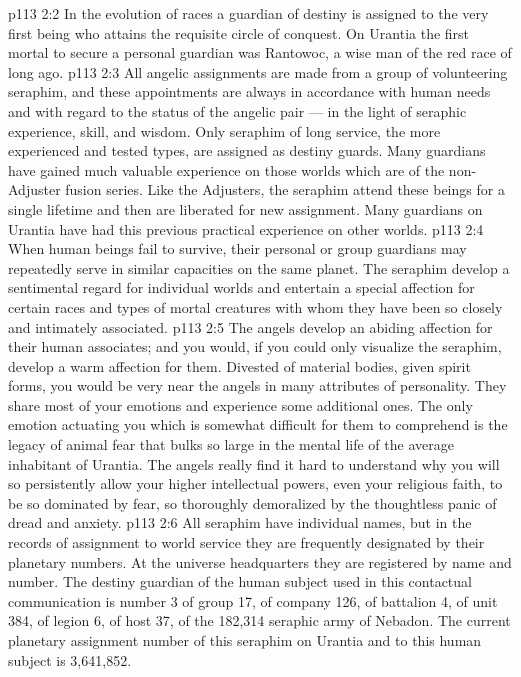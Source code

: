 \vs p113 2:2 In the evolution of races a guardian of destiny is assigned to the very first being who attains the requisite circle of conquest. On Urantia the first mortal to secure a personal guardian was Rantowoc, a wise man of the red race of long ago.
\vs p113 2:3 All angelic assignments are made from a group of volunteering seraphim, and these appointments are always in accordance with human needs and with regard to the status of the angelic pair --- in the light of seraphic experience, skill, and wisdom. Only seraphim of long service, the more experienced and tested types, are assigned as destiny guards. Many guardians have gained much valuable experience on those worlds which are of the non\hyp{}Adjuster fusion series. Like the Adjusters, the seraphim attend these beings for a single lifetime and then are liberated for new assignment. Many guardians on Urantia have had this previous practical experience on other worlds.
\vs p113 2:4 \pc When human beings fail to survive, their personal or group guardians may repeatedly serve in similar capacities on the same planet. The seraphim develop a sentimental regard for individual worlds and entertain a special affection for certain races and types of mortal creatures with whom they have been so closely and intimately associated.
\vs p113 2:5 The angels develop an abiding affection for their human associates; and you would, if you could only visualize the seraphim, develop a warm affection for them. Divested of material bodies, given spirit forms, you would be very near the angels in many attributes of personality. They share most of your emotions and experience some additional ones. The only emotion actuating you which is somewhat difficult for them to comprehend is the legacy of animal fear that bulks so large in the mental life of the average inhabitant of Urantia. The angels really find it hard to understand why you will so persistently allow your higher intellectual powers, even your religious faith, to be so dominated by fear, so thoroughly demoralized by the thoughtless panic of dread and anxiety.
\vs p113 2:6 \pc All seraphim have individual names, but in the records of assignment to world service they are frequently designated by their planetary numbers. At the universe headquarters they are registered by name and number. The destiny guardian of the human subject used in this contactual communication is number 3 of group 17, of company 126, of battalion 4, of unit 384, of legion 6, of host 37, of the 182,314 seraphic army of Nebadon. The current planetary assignment number of this seraphim on Urantia and to this human subject is 3,641,852.
